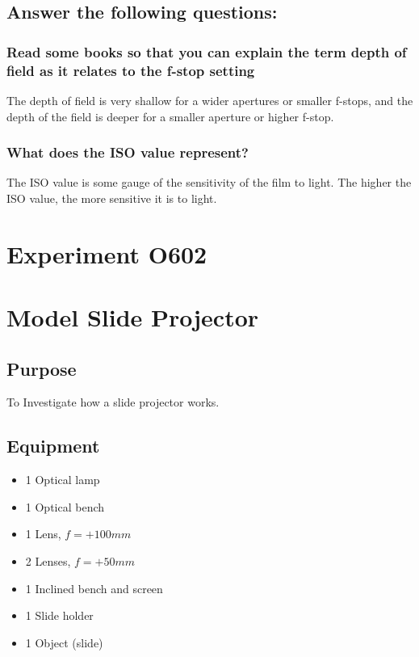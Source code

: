 \documentclass[12pt]{article}
\begin{document}
\subsection*{Answer the following questions:}

\subsubsection*{Read some books so that you can explain the term depth of field as it relates to the f-stop setting}

The depth of field is very shallow for a wider apertures or smaller f-stops, and the depth of the field is deeper for a smaller aperture or higher f-stop.

\subsubsection*{What does the ISO value represent?}

The ISO value is some gauge of the sensitivity of the film to light. The higher the ISO value, the more sensitive it is to light.

\newpage
\section*{Experiment O602}

\section*{Model Slide Projector}

\subsection*{Purpose}
To Investigate how a slide projector works.

\subsection*{Equipment}

\begin{itemize}
    \item 1 Optical lamp
    \item 1 Optical bench
    \item 1 Lens, $f=+100 mm$
    \item 2 Lenses, $f=+50 mm$
    \item 1 Inclined bench and screen
    \item 1 Slide holder
    \item 1 Object (slide)
\end{itemize}
\end{document}
